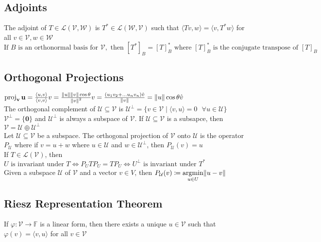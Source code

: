 \documentclass{article}
\DeclarePairedDelimiter\norm{\lVert}{\rVert}%
\DeclareMathOperator{\PProjection}{proj}
\DeclareMathOperator*{\argmin}{argmin}
\newcommand{\F}{\mathbb{F}}
\newcommand{\linear}{\mathcal{L}}
\newcommand{\U}{\mathcal{U}}
\newcommand{\V}{\mathcal{V}}
\newcommand{\W}{\mathcal{W}}
\newcommand\inner[2]{\langle #1, #2 \rangle}
\newcommand{\vct}{\mathbf}
\newcommand{\PProj}[2][]{\PProjection_{\vct{#1}}\vct{#2}}
\begin{document}
\subsection{Adjoints}
The adjoint of $T \in \linear(\V, \W)$ is $T^* \in \linear(\W, \V)$ such that $\inner{Tv}{w} = \inner{v}{T^*w}$ for all $v \in \V, w \in \W$ \\
$\mbox{If } B \mbox { is an orthonormal basis for }\V, \mbox{ then }[T^*]_B = [T]_B^* \mbox{ where } [T]_B^* \mbox{ is the conjugate transpose of } [T]_B$

\subsection{Orthogonal Projections}
$\PProj[v] {u} = \frac{\inner{u}{v}}{\inner{v}{v}} v = \frac{\norm u \norm v \cos \theta}{{\norm v}^2}v = \frac{(u_1v_2 + \ldots u_nv_n)\hat{v}}{\norm v}  = \norm u \cos \theta \hat{v}$ \\
The orthogonal complement of $\U \subseteq \V$ is $\U^{\perp} = \{v \in \V \mid \inner{v}{u} = 0 \mbox{ }\forall u \in \U \}$ \\
$\V^{\perp} = \{\boldsymbol{0}\}$ and $\U^{\perp}$ is always a subspace of $\V$. If $\U \subseteq \V$ is a subsapce, then $\V = \U \oplus \U^{\perp}$ \\
Let $\U \subseteq \V$ be a subspace. The orthogonal projection of $\V$ onto $\U$ is the operator $P_{\U}$ where if $v = u + w$ where $u \in \U$ and $w \in \U^{\perp}$, then $P_{\U}(v) = u$ \\
If $T \in \linear(\V)$, then $U\mbox{ is invariant under }T \iff P_UTP_U = TP_U \iff U^\perp \mbox{ is invariant under }T^*$ \\
Given a subspace $\U$ of $\V$ and a vector $v \in V$, then $P_{\U}(v) \coloneqq \argmin\limits_{u \in U} \norm{u - v}$ 


\subsection{Riesz Representation Theorem}
If $\varphi: \V \rightarrow \F$ is a linear form, then there exists a unique $u \in \V$ such that $\varphi(v) = \inner v u$ for all $v \in \V$
\end{document}
